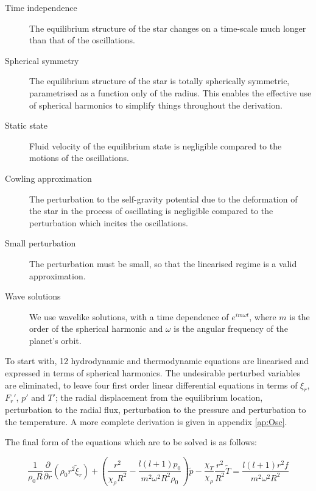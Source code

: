 \documentclass[11pt]{amsart}
\begin{document}
\begin{description}
\item[Time independence]
 The equilibrium structure of the star changes on a time-scale much longer than that of the oscillations.
 
 \item[Spherical symmetry]
 The equilibrium structure of the star is totally spherically symmetric, parametrised as a function only of the radius.  This enables the effective use of spherical harmonics to simplify things throughout the derivation.
 
 \item[Static state]
 Fluid velocity of the equilibrium state is negligible compared to the motions of the oscillations.
 
 \item[Cowling approximation]
 The perturbation to the self-gravity potential due to the deformation of the star in the process of oscillating is negligible compared to the perturbation which incites the oscillations.
 
 \item[Small perturbation]
 The perturbation must be small, so that the linearised regime is a valid approximation.
 
 \item[Wave solutions]
 We use wavelike solutions, with a time dependence of $e^{i m \omega t}$, where $m$ is the order of the spherical harmonic and $\omega$ is the angular frequency of the planet's orbit.
\end{description}


To start with, 12 hydrodynamic and thermodynamic equations are linearised and expressed in terms of spherical harmonics. The undesirable perturbed variables are eliminated, to leave four first order linear differential equations in terms of $\xi_{r}$, $F_{r}'$, $p'$ and $T'$; the radial displacement from the equilibrium location, perturbation to the radial flux, perturbation to the pressure and perturbation to the temperature.  A more complete derivation is given in appendix \ref{ap:Osc}.

The final form of the equations which are to be solved is as follows:


\begin{equation} \label{eq:cont_osc_dim2}
\frac{1}{\rho_{0} R}  \frac{\partial}{\partial r}\left( \rho_{0} r^{2} \tilde{\xi}_{r} \right)
+ \left( \frac{r^{2}}{\chi_{\rho} R^{2}} - \frac{l (l+1) p_{0}}{m^{2} \omega^{2} R^{2} \rho_{0} } \right) \tilde{p}
- \frac{\chi_{T}}{\chi_{\rho}} \frac{r^{2}}{R^{2}} \tilde{T}
=
\frac{l (l+1) r^{2} f}{m^{2} \omega^{2} R^{2}}
\end{equation}
\end{document}
